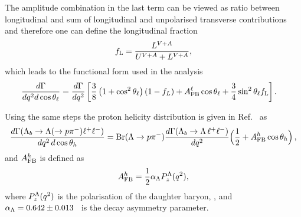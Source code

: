 The amplitude combination in the last term can be viewed as ratio between longitudinal and sum of
longitudinal and unpolarised transverse contributions and therefore one can define the longitudinal fraction
\begin{equation}
f_{\rm L}=\frac{L^{V+A}}{U^{V+A}+L^{V+A}},
\end{equation}
which leads to the functional form used in the analysis
\begin{align}
\frac{d\Gamma}{dq^2d\cos\theta_\ell}=
\frac{d\Gamma}{dq^2}&\left[  \frac{3}{8}\left(1+\cos^2\theta_\ell\right)(1-f_L)+A_{\rm FB}^\ell\cos\theta_\ell +
   \frac{3}{4}\sin^2\theta_\ell f_{\rm L}\right]. 
   \label{eq:afbLTh}
\end{align}

Using the same steps the proton helicity distribution is given in Ref.~\cite{Gutsche:2013pp} as
\begin{equation}
\frac{d\Gamma(\Lambda_{b}\to \Lambda(\to p \pi^{-})\ell^{+}\ell^{-})}
     {dq^2\,d\cos\theta_h} 
={\rm Br}(\Lambda \to p\pi^{-})
 \frac{d\Gamma(\Lambda_b \to \Lambda\, \ell^{+}\ell^{-})}{d q^2}
\Big(\frac{1}{2}+A_{\rm FB}^h\cos\theta_h\Big) \,,
\label{eq:afbBTh}
\end{equation}
and $A_{\rm FB}^h$ is defined as
\begin{equation}
A_{\rm FB}^h=\frac{1}{2}\alpha_{\Lambda}P_z^\Lambda(q^2),
\end{equation} 
where $P_z^\Lambda(q^2)$ is the polarisation of the daughter baryon, \Lz,
and $\alpha_{\Lambda} = 0.642 \pm 0.013$~\cite{PDG2014} is the \Lz decay asymmetry parameter.



